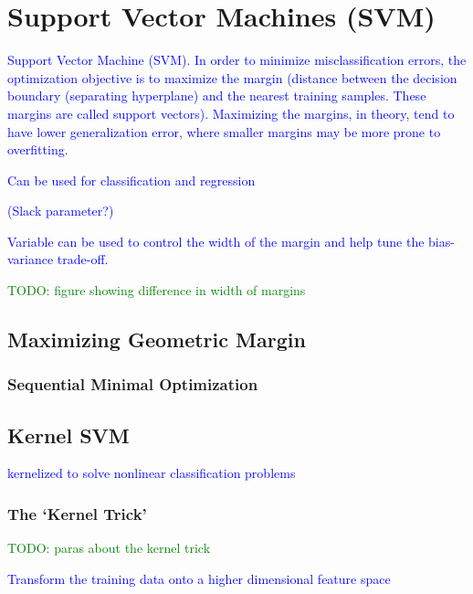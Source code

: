 \section{Support Vector Machines (SVM)}

\textcolor{blue}{Support Vector Machine (SVM). In order to minimize misclassification errors, the optimization objective is to maximize the margin (distance between the decision boundary (separating hyperplane) and the nearest training samples. These margins are called support vectors). Maximizing the margins, in theory, tend to have lower generalization error, where smaller margins may be more prone to overfitting.}

\textcolor{blue}{Can be used for classification and regression}

\textcolor{blue}{(Slack parameter?)}

\textcolor{blue}{Variable can be used to control the width of the margin and help tune the bias-variance trade-off.}

\textcolor{green}{TODO: figure showing difference in width of margins}

\subsection{Maximizing Geometric Margin}

\subsubsection{Sequential Minimal Optimization}

\subsection{Kernel SVM}

\textcolor{blue}{kernelized to solve nonlinear classification problems}

\subsubsection{The `Kernel Trick'}

\textcolor{green}{TODO: paras about the kernel trick}

\textcolor{blue}{Transform the training data onto a higher dimensional feature space}